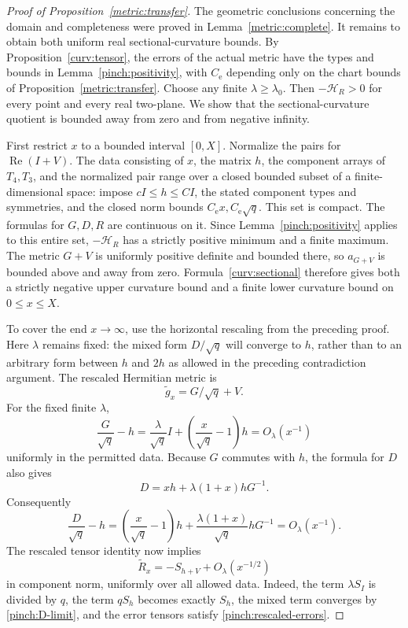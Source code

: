 \begin{proof}[Proof of Proposition~\ref{metric:transfer}]
The geometric conclusions concerning the domain and completeness were
proved in Lemma~\ref{metric:complete}.
It remains to obtain both uniform real sectional-curvature bounds.
By Proposition~\ref{curv:tensor}, the errors of the actual metric have
the types and bounds in Lemma~\ref{pinch:positivity}, with
\(C_{\mathrm e}\) depending only on the chart bounds of
Proposition~\ref{metric:transfer}.
Choose any finite \(\lambda\ge\lambda_0\).
Then \(-\mathcal H_R>0\) for every point and every real two-plane.
We show that the sectional-curvature quotient is bounded away from
zero and from negative infinity.

First restrict \(x\) to a bounded interval \([0,X]\).
Normalize the pairs for \(\operatorname{Re}(I+V)\).
The data consisting of \(x\), the matrix \(h\), the component arrays
of \(T_4,T_3\), and the normalized pair range over a closed bounded
subset of a finite-dimensional space: impose
\(cI\le h\le CI\), the stated component types and symmetries, and
the closed norm bounds \(C_{\mathrm e}x,C_{\mathrm e}\sqrt q\).
This set is compact.
The formulas for \(G,D,R\) are continuous on it.
Since Lemma~\ref{pinch:positivity} applies to this entire set,
\(-\mathcal H_R\) has a strictly positive minimum and a finite maximum.
The metric \(G+V\) is uniformly positive definite and bounded there,
so \(a_{G+V}\) is bounded above and away from zero.
Formula~\eqref{curv:sectional} therefore gives both a strictly negative
upper curvature bound and a finite lower curvature bound on
\(0\le x\le X\).

To cover the end \(x\to\infty\), use the horizontal rescaling from
the preceding proof.
Here \(\lambda\) remains fixed: the mixed form \(D/\sqrt q\) will
converge to \(h\), rather than to an arbitrary form between \(h\)
and \(2h\) as allowed in the preceding contradiction argument.
The rescaled Hermitian metric is
\[
 \widetilde g_x=G/\sqrt q+V.
\]
For the fixed finite \(\lambda\),
\begin{equation}\label{pinch:metric-limit}
 \frac G{\sqrt q}-h
 =\frac{\lambda}{\sqrt q}I+
   \left(\frac{x}{\sqrt q}-1\right)h
 =O_\lambda(x^{-1})
\end{equation}
uniformly in the permitted data.
Because \(G\) commutes with \(h\), the formula for \(D\) also gives
\[
 D=xh+\lambda(1+x)hG^{-1}.
\]
Consequently
\begin{equation}\label{pinch:D-limit}
 \frac D{\sqrt q}-h
 =\left(\frac{x}{\sqrt q}-1\right)h+
   \frac{\lambda(1+x)}{\sqrt q}hG^{-1}
 =O_\lambda(x^{-1}).
\end{equation}
The rescaled tensor identity now implies
\begin{equation}\label{pinch:tensor-limit}
 \widetilde R_x=-S_{h+V}+O_\lambda(x^{-1/2})
\end{equation}
in component norm, uniformly over all allowed data.
Indeed, the term \(\lambda S_I\) is divided by \(q\), the term
\(qS_h\) becomes exactly \(S_h\), the mixed term converges by
\eqref{pinch:D-limit}, and the error tensors satisfy
\eqref{pinch:rescaled-errors}.


\end{proof}
